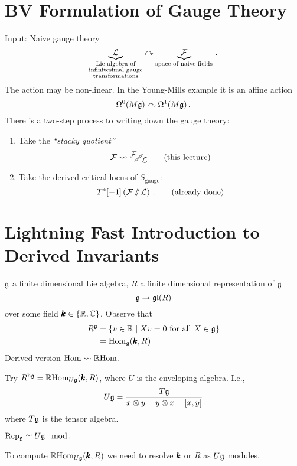 \section{BV Formulation of Gauge Theory}

Input: Naive gauge theory
\begin{equation*}
\underbrace{\mathcal{L}}_{
  \substack{\text{Lie algebra of}\\
    \text{infinitesimal gauge}\\
    \text{transformations}} } \curvearrowright
\underbrace{\mathcal{F}}_{\text{space of naive fields}}\,.
\end{equation*}
The action may be non-linear. In the Young-Mills example it is an
affine action
\begin{equation*}
  \Omega^0 (M\mathfrak{g})\curvearrowright\Omega^1 (M\mathfrak{g})\,.
\end{equation*}
There is a two-step process to writing down the gauge theory:
\begin{enumerate}
\item Take the {\em ``stacky quotient''}
  \begin{equation*}
    \Fcal \rightsquigarrow \doublequotient{\Fcal}{\Lcal} \qquad \text{(this lecture)}
  \end{equation*}
\item Take the derived critical locus of $S_\text{gauge}$:
  \begin{equation*}
    T^*[-1]\left(\mathcal{F}\operatorname{/\mkern-6mu/}\mathcal{L}\right)\,. \qquad \text{(already done)}
  \end{equation*}
\end{enumerate}

\section{Lightning Fast Introduction to Derived Invariants}
$\mathfrak{g}$ a finite dimensional Lie algebra, $R$ a finite dimensional
representation of $\mathfrak{g}$
\begin{equation*}
  \mathfrak{g}\rightarrow\mathfrak{gl} (R)
\end{equation*}
over some field $\pmb{k}\in\{\mathbb{R},\mathbb{C}\}$.
Observe that
\begin{align*}
  R^{\mathfrak{g}}&=\{v\in \mathbb{R} \mid Xv=0 \text{ for all } X\in\mathfrak{g} \}\\
          &=\mathrm{Hom}_{\mathfrak{g}} (\pmb{k},R)
\end{align*}
Derived version $\mathrm{Hom} \rightsquigarrow \mathbb{R}\mathrm{Hom}$.

Try $R^{\mathrm{h}\mathfrak{g}}=\mathbb{R}\mathrm{Hom}_{U\mathfrak{g}} (\pmb{k},R)$, where
$U$ is the enveloping algebra. I.e.,
\begin{equation*}
  U\mathfrak{g}=\frac{T\mathfrak{g}}{x\otimes{}y-y\otimes{}x-[x,y]}
\end{equation*}
where $T\mathfrak{g}$ is the tensor algebra.
\begin{fact}
  $\mathrm{Rep_{\mathfrak{g}}}\simeq U\mathfrak{g}\mathrm{-mod}\,.$
\end{fact}
To compute $\mathbb{R}\mathrm{Hom}_{U\mathfrak{g}} (\pmb{k},R)$ we need to resolve $\pmb{k}$
or $R$ as $U\mathfrak{g}$ modules.

